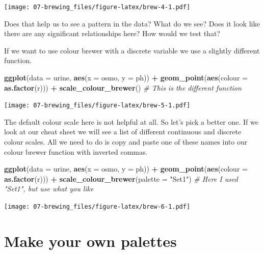 \documentclass[
]{book}
\newenvironment{Shaded}{\begin{snugshade}}{\end{snugshade}}
\newcommand{\CommentTok}[1]{\textcolor[rgb]{0.56,0.35,0.01}{\textit{#1}}}
\newcommand{\DataTypeTok}[1]{\textcolor[rgb]{0.13,0.29,0.53}{#1}}
\newcommand{\KeywordTok}[1]{\textcolor[rgb]{0.13,0.29,0.53}{\textbf{#1}}}
\newcommand{\NormalTok}[1]{#1}
\newcommand{\OperatorTok}[1]{\textcolor[rgb]{0.81,0.36,0.00}{\textbf{#1}}}
\newcommand{\StringTok}[1]{\textcolor[rgb]{0.31,0.60,0.02}{#1}}
\begin{document}
\texttt{[image: 07-brewing\_files/figure-latex/brew-4-1.pdf]}

Does that help us to see a pattern in the data? What do we see? Does it look like there are any significant relationships here? How would we test that?

If we want to use colour brewer with a discrete variable we use a slightly different function.

\begin{Shaded}
\begin{Highlighting}[]
\KeywordTok{ggplot}\NormalTok{(}\DataTypeTok{data =}\NormalTok{ urine, }\KeywordTok{aes}\NormalTok{(}\DataTypeTok{x =}\NormalTok{ osmo, }\DataTypeTok{y =}\NormalTok{ ph)) }\OperatorTok{+}
\StringTok{  }\KeywordTok{geom\_point}\NormalTok{(}\KeywordTok{aes}\NormalTok{(}\DataTypeTok{colour =} \KeywordTok{as.factor}\NormalTok{(r))) }\OperatorTok{+}
\StringTok{  }\KeywordTok{scale\_colour\_brewer}\NormalTok{() }\CommentTok{\# This is the different function}
\end{Highlighting}
\end{Shaded}

\texttt{[image: 07-brewing\_files/figure-latex/brew-5-1.pdf]}

The default colour scale here is not helpful at all. So let's pick a better one. If we look at our cheat sheet we will see a list of different continuous and discrete colour scales. All we need to do is copy and paste one of these names into our colour brewer function with inverted commas.

\begin{Shaded}
\begin{Highlighting}[]
\KeywordTok{ggplot}\NormalTok{(}\DataTypeTok{data =}\NormalTok{ urine, }\KeywordTok{aes}\NormalTok{(}\DataTypeTok{x =}\NormalTok{ osmo, }\DataTypeTok{y =}\NormalTok{ ph)) }\OperatorTok{+}
\StringTok{  }\KeywordTok{geom\_point}\NormalTok{(}\KeywordTok{aes}\NormalTok{(}\DataTypeTok{colour =} \KeywordTok{as.factor}\NormalTok{(r))) }\OperatorTok{+}
\StringTok{  }\KeywordTok{scale\_colour\_brewer}\NormalTok{(}\DataTypeTok{palette =} \StringTok{"Set1"}\NormalTok{) }\CommentTok{\# Here I used "Set1", but use what you like}
\end{Highlighting}
\end{Shaded}

\texttt{[image: 07-brewing\_files/figure-latex/brew-6-1.pdf]}

\hypertarget{make-your-own-palettes}{%
\section{Make your own palettes}\label{make-your-own-palettes}}
\end{document}

